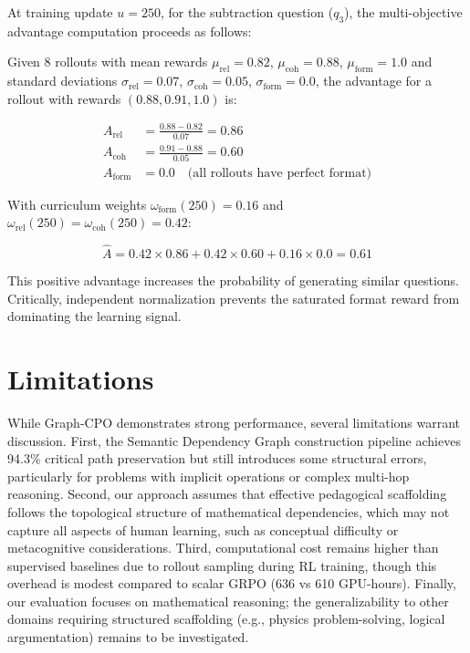 \documentclass[sigconf, anonymous, review, screen]{acmart}
\begin{document}
At training update $u=250$, for the subtraction question ($q_3$), the multi-objective advantage computation proceeds as follows:

Given 8 rollouts with mean rewards $\mu_{\text{rel}}=0.82$, $\mu_{\text{coh}}=0.88$, $\mu_{\text{form}}=1.0$ and standard deviations $\sigma_{\text{rel}}=0.07$, $\sigma_{\text{coh}}=0.05$, $\sigma_{\text{form}}=0.0$, the advantage for a rollout with rewards $(0.88, 0.91, 1.0)$ is:

\begin{align}
A_{\text{rel}} &= \frac{0.88 - 0.82}{0.07} = 0.86 \\
A_{\text{coh}} &= \frac{0.91 - 0.88}{0.05} = 0.60 \\
A_{\text{form}} &= 0.0 \quad \text{(all rollouts have perfect format)}
\end{align}

With curriculum weights $\omega_{\text{form}}(250)=0.16$ and $\omega_{\text{rel}}(250)=\omega_{\text{coh}}(250)=0.42$:

$$
\hat{A} = 0.42 \times 0.86 + 0.42 \times 0.60 + 0.16 \times 0.0 = 0.61
$$

This positive advantage increases the probability of generating similar questions. Critically, independent normalization prevents the saturated format reward from dominating the learning signal.



\section{Limitations}

While Graph-CPO demonstrates strong performance, several limitations warrant discussion. First, the Semantic Dependency Graph construction pipeline achieves 94.3\% critical path preservation but still introduces some structural errors, particularly for problems with implicit operations or complex multi-hop reasoning. Second, our approach assumes that effective pedagogical scaffolding follows the topological structure of mathematical dependencies, which may not capture all aspects of human learning, such as conceptual difficulty or metacognitive considerations. Third, computational cost remains higher than supervised baselines due to rollout sampling during RL training, though this overhead is modest compared to scalar GRPO (636 vs 610 GPU-hours). Finally, our evaluation focuses on mathematical reasoning; the generalizability to other domains requiring structured scaffolding (e.g., physics problem-solving, logical argumentation) remains to be investigated.
\end{document}
